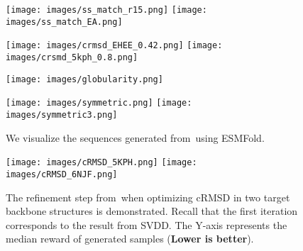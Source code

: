 \begin{figure*}[!th]
    \centering
 \begin{minipage}{0.24\textwidth}  %
    \centering
    \texttt{[image: images/ss\_match\_r15.png]}
     \texttt{[image: images/ss\_match\_EA.png]}
  \end{minipage} \hfill
 \begin{minipage}{0.24\textwidth}  %
    \centering
   \texttt{[image: images/crmsd\_EHEE\_0.42.png]}
   \texttt{[image: images/crsmd\_5kph\_0.8.png]}
  \end{minipage} \hfill
   \begin{minipage}{0.18\textwidth}  %
    \centering
    \texttt{[image: images/globularity.png]}
  \end{minipage} 
  \begin{minipage}{0.30\textwidth}  %
    \centering
    \texttt{[image: images/symmetric.png]}
   \texttt{[image: images/symmetric3.png]}
  \end{minipage} 

     \caption{We visualize the sequences generated from \alg\,using ESMFold. }
    \label{fig:generated_results}
\end{figure*}

\begin{figure}[!th]
    \centering
     \texttt{[image: images/cRMSD\_5KPH.png]}
     \texttt{[image: images/cRMSD\_6NJF.png]}
    \caption{The refinement step from \alg\,when optimizing cRMSD in two target backbone structures is demonstrated. Recall that the first iteration corresponds to the result from SVDD. The Y-axis represents the median reward of generated samples (\textbf{Lower is better}). }
    \label{fig:refinement}
\end{figure}


